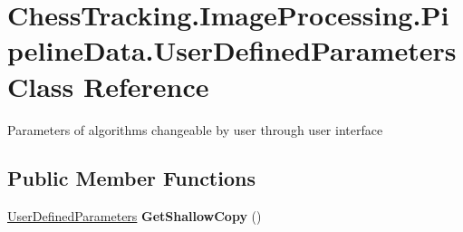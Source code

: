 \hypertarget{class_chess_tracking_1_1_image_processing_1_1_pipeline_data_1_1_user_defined_parameters}{}\section{Chess\+Tracking.\+Image\+Processing.\+Pipeline\+Data.\+User\+Defined\+Parameters Class Reference}
\label{class_chess_tracking_1_1_image_processing_1_1_pipeline_data_1_1_user_defined_parameters}


Parameters of algorithms changeable by user through user interface  


\subsection*{Public Member Functions}
\begin{DoxyCompactItemize}
\item 
\mbox{\label{class_chess_tracking_1_1_image_processing_1_1_pipeline_data_1_1_user_defined_parameters_ac145dcbb909d5c7a3ea2bd1d7d249027}} 
\mbox{\hyperlink{class_chess_tracking_1_1_image_processing_1_1_pipeline_data_1_1_user_defined_parameters}{User\+Defined\+Parameters}} {\bfseries Get\+Shallow\+Copy} ()
\end{DoxyCompactItemize}
